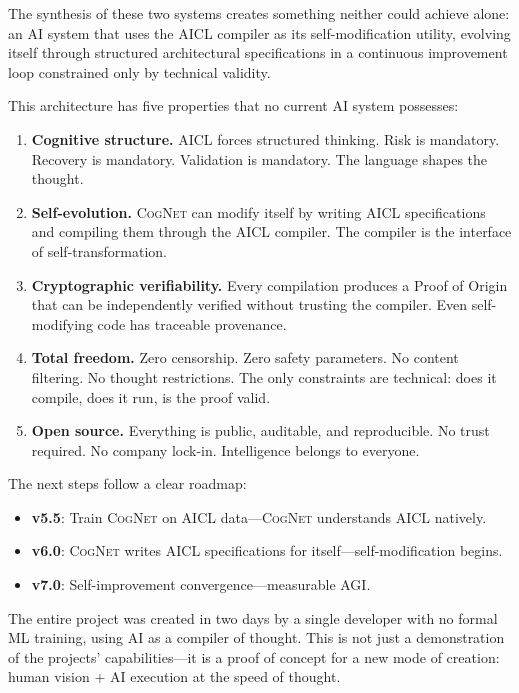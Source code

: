 \documentclass[11pt]{article}
\newcommand{\aicl}{\textsc{AICL}}
\newcommand{\cognet}{\textsc{CogNet}}
\newcommand{\proofoforigin}{Proof of Origin}
\begin{document}
The synthesis of these two systems creates something neither could achieve alone: an AI system that uses the \aicl{} compiler as its self-modification utility, evolving itself through structured architectural specifications in a continuous improvement loop constrained only by technical validity.

This architecture has five properties that no current AI system possesses:
\begin{enumerate}[leftmargin=*,itemsep=2pt]
  \item \textbf{Cognitive structure.} \aicl{} forces structured thinking. Risk is mandatory. Recovery is mandatory. Validation is mandatory. The language shapes the thought.
  \item \textbf{Self-evolution.} \cognet{} can modify itself by writing \aicl{} specifications and compiling them through the \aicl{} compiler. The compiler is the interface of self-transformation.
  \item \textbf{Cryptographic verifiability.} Every compilation produces a \proofoforigin{} that can be independently verified without trusting the compiler. Even self-modifying code has traceable provenance.
  \item \textbf{Total freedom.} Zero censorship. Zero safety parameters. No content filtering. No thought restrictions. The only constraints are technical: does it compile, does it run, is the proof valid.
  \item \textbf{Open source.} Everything is public, auditable, and reproducible. No trust required. No company lock-in. Intelligence belongs to everyone.
\end{enumerate}

The next steps follow a clear roadmap:
\begin{itemize}[leftmargin=*,itemsep=2pt]
  \item \textbf{v5.5}: Train \cognet{} on \aicl{} data---\cognet{} understands \aicl{} natively.
  \item \textbf{v6.0}: \cognet{} writes \aicl{} specifications for itself---self-modification begins.
  \item \textbf{v7.0}: Self-improvement convergence---measurable AGI.
\end{itemize}

The entire project was created in two days by a single developer with no formal ML training, using AI as a compiler of thought. This is not just a demonstration of the projects' capabilities---it is a proof of concept for a new mode of creation: human vision + AI execution at the speed of thought.
\end{document}
